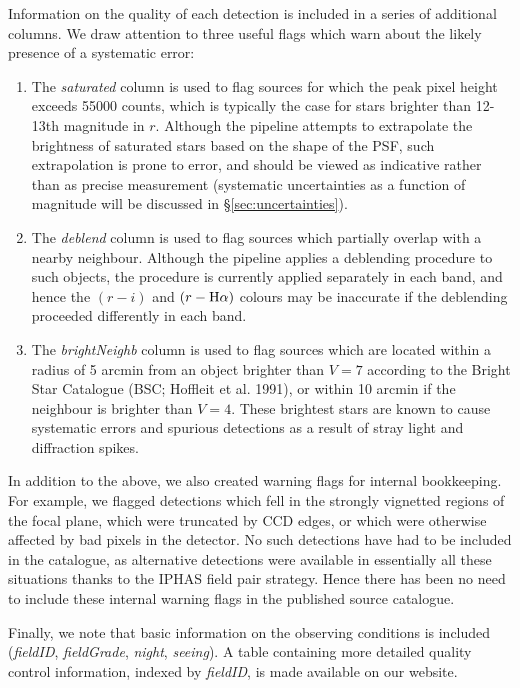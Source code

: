 \documentclass[a4paper,useAMS,usenatbib]{mn2e}
\def\ha{\mbox{H$\rm \alpha$}}
\begin{document}
Information on the quality of each detection is included 
in a series of additional columns.
We draw attention to three useful flags
which warn about the likely presence of a systematic error:
\begin{enumerate}
\item The \emph{saturated} column is used to flag sources
for which the peak pixel height exceeds 55000 counts,
which is typically the case for stars
brighter than 12-13th magnitude in $r$.
Although the pipeline attempts to extrapolate the brightness of
saturated stars based on the shape of the PSF,
such extrapolation is prone to error,
and should be viewed as indicative rather than as precise measurement
(systematic uncertainties as a function of magnitude
will be discussed in \S\ref{sec:uncertainties}).
\item The \emph{deblend} column is used to flag sources 
which partially overlap with a nearby neighbour.
Although the pipeline applies a deblending procedure
to such objects, the procedure is currently applied separately
in each band, and hence the $(r-i)$ and $(r-\ha)$ colours
may be inaccurate if the deblending proceeded differently in each band.
\item The \emph{brightNeighb} column is used to flag sources which are located
within a radius of 5 arcmin from an object brighter than $V=7$ 
according to the Bright Star Catalogue (BSC; Hoffleit et al. 1991), 
or within 10 arcmin if the neighbour is brighter than $V=4$.
These brightest stars are known to cause systematic errors
and spurious detections as a result of stray light 
and diffraction spikes.
\end{enumerate}
In addition to the above, we also created warning flags for internal bookkeeping.
For example, we flagged detections which fell in the strongly vignetted regions of the focal plane,
which were truncated by CCD edges,
or which were otherwise affected by bad pixels in the detector.
No such detections have had to be included in the catalogue, as 
alternative detections were available in essentially all these situations
thanks to the IPHAS field pair strategy. 
Hence there has been no need to include these internal warning flags
in the published source catalogue.

Finally, we note that basic information on the observing conditions
is included (\emph{fieldID}, \emph{fieldGrade}, \emph{night}, \emph{seeing}).
A table containing more detailed quality control information,
indexed by \emph{fieldID}, is made available on our website.
\end{document}
